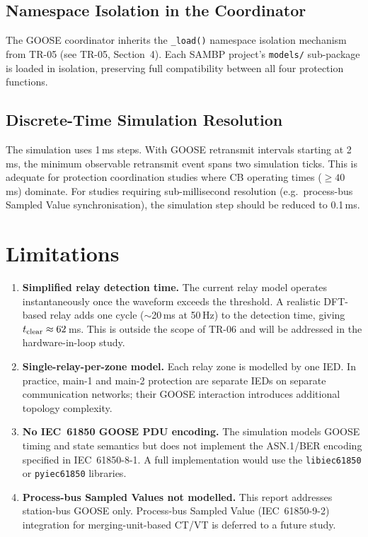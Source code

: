 \documentclass[12pt,a4paper]{article}
\begin{document}
\subsection{Namespace Isolation in the Coordinator}

The GOOSE coordinator inherits the \texttt{\_load()} namespace isolation
mechanism from TR-05 (see TR-05, Section~4).  Each SAMBP project's
\texttt{models/} sub-package is loaded in isolation, preserving full
compatibility between all four protection functions.

\subsection{Discrete-Time Simulation Resolution}

The simulation uses 1\,ms steps.  With GOOSE retransmit intervals
starting at 2\,ms, the minimum observable retransmit event spans two
simulation ticks.  This is adequate for protection coordination studies
where CB operating times ($\ge 40$\,ms) dominate.  For studies requiring
sub-millisecond resolution (e.g.\ process-bus Sampled Value
synchronisation), the simulation step should be reduced to 0.1\,ms.

\section{Limitations}
\label{sec:limit}

\begin{enumerate}
  \item \textbf{Simplified relay detection time.}
    The current relay model operates instantaneously once the waveform
    exceeds the threshold.  A realistic DFT-based relay adds one cycle
    ($\sim$20\,ms at 50\,Hz) to the detection time, giving
    $t_{\rm clear} \approx 62$\,ms.  This is outside the scope of TR-06
    and will be addressed in the hardware-in-loop study.

  \item \textbf{Single-relay-per-zone model.}
    Each relay zone is modelled by one IED.  In practice, main-1 and
    main-2 protection are separate IEDs on separate communication
    networks; their GOOSE interaction introduces additional topology
    complexity.

  \item \textbf{No IEC~61850 GOOSE PDU encoding.}
    The simulation models GOOSE timing and state semantics but does not
    implement the ASN.1/BER encoding specified in IEC~61850-8-1.
    A full implementation would use the \texttt{libiec61850} or
    \texttt{pyiec61850} libraries.

  \item \textbf{Process-bus Sampled Values not modelled.}
    This report addresses station-bus GOOSE only.  Process-bus Sampled
    Value (IEC~61850-9-2) integration for merging-unit-based CT/VT is
    deferred to a future study.
\end{enumerate}
\end{document}
